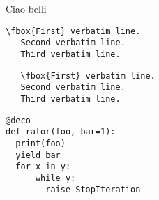 \documentclass{article}
\begin{document}
Ciao belli


\begin{Verbatim}[frame=single,numbers=right,commandchars=\\\{\}]
   \fbox{First} verbatim line.
   Second verbatim line.
   Third verbatim line.
\end{Verbatim}

\begin{verbatim}
   \fbox{First} verbatim line.
   Second verbatim line.
   Third verbatim line.
\end{verbatim}

\begin{lstlisting}
@deco
def rator(foo, bar=1):
  print(foo)
  yield bar
  for x in y:
      while y:
        raise StopIteration
\end{lstlisting}
\end{document}
